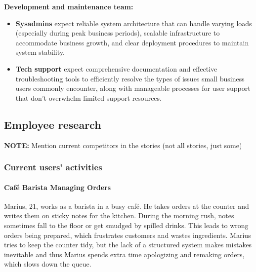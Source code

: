 \documentclass[]{VUMIFTemplateClass}
\newcommand{\noticecomment}[1]{%
    \begin{tcolorbox}[colback=blue!20, colframe=blue!60, arc=0pt, outer arc=0pt, boxrule=1pt, left=3pt, right=3pt, top=3pt, bottom=3pt]
        \textbf{\textcolor{blue!70!black}{NOTE:}} #1
    \end{tcolorbox}
}
\newcommand{\subsubsubsection}[1]{\paragraph{#1}}
\begin{document}
\textbf{Development and maintenance team:}
\begin{itemize}
    \item \textbf{Sysadmins} expect reliable system architecture that can handle
    varying loads (especially during peak business periods), scalable
    infrastructure to accommodate business growth, and clear deployment
    procedures to maintain system stability.
    \item \textbf{Tech support} expect comprehensive documentation and effective
    troubleshooting tools to efficiently resolve the types of issues small
    business users commonly encounter, along with manageable processes for user
    support that don't overwhelm limited support resources.
\end{itemize}





\subsection{Employee research}
\noticecomment{Mention current competitors in the stories (not all stories, just some)}

\subsubsection{Current users' activities}

\subsubsubsection{Café Barista Managing Orders}

Marius, 21, works as a barista in a busy café. He takes orders at the counter
and writes them on sticky notes for the kitchen. During the morning rush, notes
sometimes fall to the floor or get smudged by spilled drinks. This leads to
wrong orders being prepared, which frustrates customers and wastes ingredients.
Marius tries to keep the counter tidy, but the lack of a structured system makes
mistakes inevitable and thus Marius spends extra time apologizing and remaking
orders, which slows down the queue.
\end{document}
